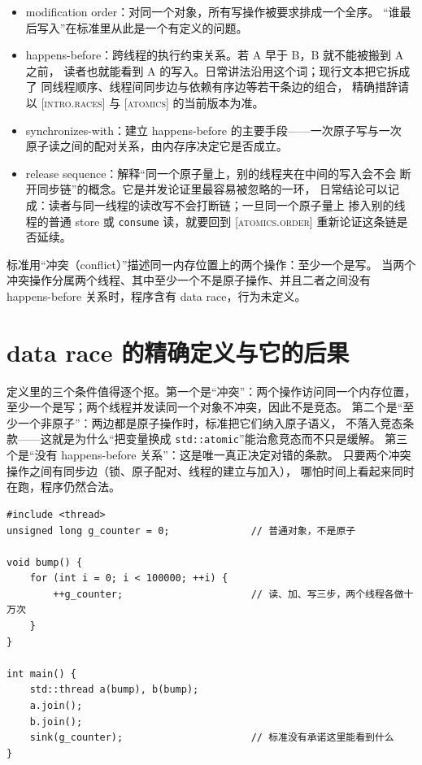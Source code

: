 \documentclass[12pt,a4paper,fontset=fandol]{ctexbook}
\newcommand{\Tp}[1]{\texttt{#1}}
\newcommand{\Std}[1]{\textsc{[#1]}}
\newcommand{\Mx}[1]{\textsf{#1}}
\begin{document}
\begin{itemize}
  \item \Mx{modification order}：对同一个对象，所有写操作被要求排成一个全序。
        “谁最后写入”在标准里从此是一个有定义的问题。
  \item \Mx{happens-before}：跨线程的执行约束关系。若 A 早于 B，B 就不能被搬到 A 之前，
        读者也就能看到 A 的写入。日常讲法沿用这个词；现行文本把它拆成了
        同线程顺序、线程间同步边与依赖有序边等若干条边的组合，
        精确措辞请以 \Std{intro.races} 与 \Std{atomics} 的当前版本为准。
  \item \Mx{synchronizes-with}：建立 happens-before 的主要手段——一次原子写与一次
        原子读之间的配对关系，由内存序决定它是否成立。
  \item \Mx{release sequence}：解释“同一个原子量上，别的线程夹在中间的写入会不会
        断开同步链”的概念。它是并发论证里最容易被忽略的一环，
        日常结论可以记成：读者与同一线程的读改写不会打断链；一旦同一个原子量上
        掺入别的线程的普通 store 或 \Tp{consume} 读，就要回到 \Std{atomics.order}
        重新论证这条链是否延续。
\end{itemize}

\begin{clause}[title={标准怎么说：竞态的三个条件}]
标准用“冲突（conflict）”描述同一内存位置上的两个操作：至少一个是写。
当两个冲突操作分属两个线程、其中至少一个不是原子操作、并且二者之间没有
happens-before 关系时，程序含有 data race，行为未定义。
\end{clause}

\section{data race 的精确定义与它的后果}\label{sec:ub10-race-def}

定义里的三个条件值得逐个抠。第一个是“冲突”：两个操作访问同一个内存位置，
至少一个是写；两个线程并发读同一个对象不冲突，因此不是竞态。
第二个是“至少一个非原子”：两边都是原子操作时，标准把它们纳入原子语义，
不落入竞态条款——这就是为什么“把变量换成 \Tp{std::atomic}”能治愈竞态而不只是缓解。
第三个是“没有 happens-before 关系”：这是唯一真正决定对错的条款。
只要两个冲突操作之间有同步边（锁、原子配对、线程的建立与加入），
哪怕时间上看起来同时在跑，程序仍然合法。

\begin{lstlisting}[style=cppstyle, caption={最小竞态：两个线程对同一个普通对象做读改写}]
#include <thread>
unsigned long g_counter = 0;              // 普通对象，不是原子

void bump() {
    for (int i = 0; i < 100000; ++i) {
        ++g_counter;                      // 读、加、写三步，两个线程各做十万次
    }
}

int main() {
    std::thread a(bump), b(bump);
    a.join();
    b.join();
    sink(g_counter);                      // 标准没有承诺这里能看到什么
}
\end{lstlisting}
\end{document}
